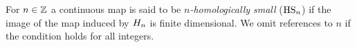 \begin{defi} \label{defi:local_connectedness}
	For $n \in \mathbb{Z}$ a continuous map is said to be \textit{$n$-homologically small} ($\mathrm{HS}_n$) if the image of the map induced by $H_{n}$ is finite dimensional.
	We omit references to $n$ if the condition holds for all integers.
\end{defi}







